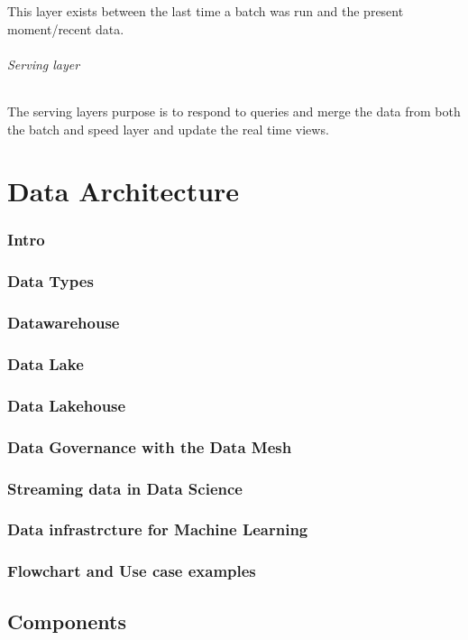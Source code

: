 \documentclass[a4paper, 11pt]{book}
\begin{document}
    This layer exists between the last time a batch was run and the present moment/recent data.

    \paragraph{Serving layer}
    The serving layers purpose is to respond to queries and merge the data from both the batch and speed layer and update the real time views.

    \part{Data Architecture}
    \section{Intro}
    \section{Data Types}
    \section{Datawarehouse}
    \section{Data Lake}
    \section{Data Lakehouse}
    \section{Data Governance with the Data Mesh}
    \section{Streaming data in Data Science}
    \section{Data infrastrcture for Machine Learning}
    \section{Flowchart and Use case examples}

    \chapter{Components}
\end{document}
